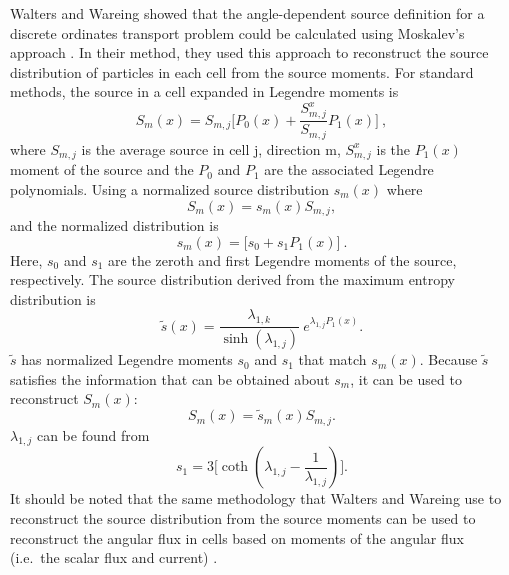Walters and Wareing \cite{walters_nonlinear_1994, walters_accurate_1996}
 showed
that the angle-dependent source definition for a discrete ordinates transport problem
could be calculated using Moskalev's approach
\cite{moskalev_reconstruction_1993}. In their method, they used this approach to
reconstruct the source distribution of particles in each cell from the source
moments. For standard methods, the source in a cell expanded in Legendre moments is
\begin{equation}
  S_m(x) = S_{m,j}\bigg[ P_0(x) + \frac{S_{m,j}^x}{S_{m,j}}P_1(x)\bigg]\:,
\end{equation}
where $S_{m,j}$ is the average source in cell j, direction m, $S_{m,j}^x$ is the
$P_1(x)$ moment of the source and the $P_0$ and $P_1$ are the associated
Legendre polynomials. Using a normalized source distribution $s_m(x)$ where
\begin{equation*}
  S_m(x) = s_m(x) S_{m,j},
\end{equation*}
and the normalized distribution is
\begin{equation}
  s_m(x) = \big[ s_0 + s_1 P_1(x)\big]\:.
\end{equation}
Here, $s_0$ and $s_1$ are the zeroth and first Legendre moments of the source, respectively.
The source distribution derived from the maximum entropy distribution is
\begin{equation}
  \tilde{s}(x) = \frac{\lambda_{1,k}}{\sinh (\lambda_{1,j})} \
  e^{\lambda_{1,j}P_1(x)} .
\end{equation}
$\tilde{s}$ has normalized Legendre moments $s_0$ and $s_1$ that match
$s_m(x)$. Because $\tilde{s}$ satisfies the information that can be obtained
about $s_m$, it can be used to reconstruct $S_m(x)$:
\begin{equation}
  S_m(x) = \tilde{s}_m(x)S_{m,j}.
\label{eq:Walt_reconstruct}
\end{equation}
$\lambda_{1,j}$ can be found from
\begin{equation}
  s_1 = 3\bigg[ \coth(\lambda_{1,j} - \frac{1}{\lambda_{1,j}})\bigg] .
  \label{eq:WW_lambda}
\end{equation}
It should be noted that the same methodology that Walters and Wareing use to reconstruct the source
distribution from the source moments can be used to reconstruct the angular flux
in cells based on moments of the angular flux (i.e.\ the scalar flux and
current) \cite{walters_nonlinear_1994}.

